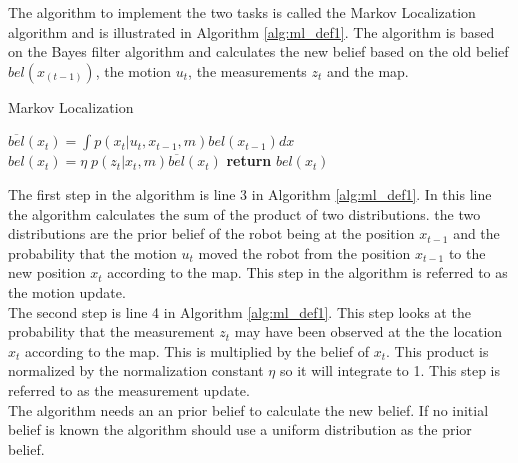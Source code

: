 The algorithm to implement the two tasks is called the Markov Localization algorithm and is illustrated in Algorithm \ref{alg:ml_def1}. The algorithm is based on the Bayes filter algorithm and calculates the new belief based on the old belief $bel(x_{(t-1)})$, the motion $u_t$, the measurements $z_t$ and the map.


\begin{center}
\begin{minipage}{.65\linewidth}
\begin{algorithm}[H]
\caption{Markov Localization}
\label{alg:ml_def1}
\begin{algorithmic}[1]
    \State $\overline{bel}(x_{t}) = \int{p(x_{t}|u_{t},x_{t-1},m)bel(x_{t-1})dx}$
    \State $bel(x_{t}) = \eta\;p(z_{t}|x_{t},m)\overline{bel}(x_{t})$
  \EndFor
  \State \textbf{return} $bel(x_{t})$
\EndProcedure
\end{algorithmic}
\end{algorithm}
\end{minipage}
\end{center}

The first step in the algorithm is line 3 in Algorithm \ref{alg:ml_def1}. In this line the algorithm calculates the sum of the product of two distributions. the two distributions are the prior belief of the robot being at the position $x_{t-1}$ and the probability that the motion $u_t$ moved the robot from the position $x_{t-1}$ to the new position $x_t$ according to the map. This step in the algorithm is referred to as the motion update. \\

The second step is line 4 in Algorithm \ref{alg:ml_def1}. This step looks at the probability that the measurement $z_t$ may have been observed at the the location $x_t$ according to the map. This is multiplied by the belief of $x_t$. This product is normalized by the normalization constant $\eta$ so it will integrate to 1. This step is referred to as the measurement update.\\

The algorithm needs an an prior belief to calculate the new belief. If no initial belief is known the algorithm should use a uniform distribution as the prior belief.

